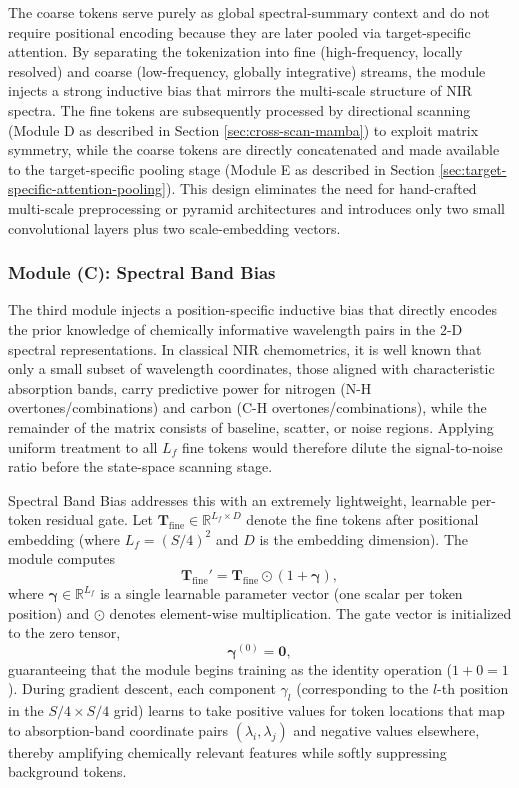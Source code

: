 \documentclass[pdflatex,sn-mathphys-num]{sn-jnl}%
\begin{document}
The coarse tokens serve purely as global spectral-summary context and do not require positional encoding because they are later pooled via target-specific attention.
By separating the tokenization into fine (high-frequency, locally resolved) and coarse (low-frequency, globally integrative) streams, the module injects a strong inductive bias that mirrors the multi-scale structure of NIR spectra. The fine tokens are subsequently processed by directional scanning (Module D as described in Section \ref{sec:cross-scan-mamba}) to exploit matrix symmetry, while the coarse tokens are directly concatenated and made available to the target-specific pooling stage (Module E as described in Section \ref{sec:target-specific-attention-pooling}). This design eliminates the need for hand-crafted multi-scale preprocessing or pyramid architectures and introduces only two small convolutional layers plus two scale-embedding vectors.

\subsubsection{Module (C): Spectral Band Bias}
The third module injects a position-specific inductive bias that directly encodes the prior knowledge of chemically informative wavelength pairs in the $2$-D spectral representations. In classical NIR chemometrics, it is well known that only a small subset of wavelength coordinates, those aligned with characteristic absorption bands, carry predictive power for nitrogen (N-H overtones/combinations) and carbon (C-H overtones/combinations), while the remainder of the matrix consists of baseline, scatter, or noise regions. Applying uniform treatment to all $L_f$ fine tokens would therefore dilute the signal-to-noise ratio before the state-space scanning stage.

Spectral Band Bias addresses this with an extremely lightweight, learnable per-token residual gate. Let $\mathbf{T}_\text{fine} \in \mathbb{R}^{L_f \times D}$ denote the fine tokens after positional embedding (where $L_f = (S/4)^2$ and $D$ is the embedding dimension). The module computes
\begin{equation}
    \mathbf{T}_\text{fine}' = \mathbf{T}_\text{fine} \odot (1 + \boldsymbol{\gamma}),
\end{equation}
where $\boldsymbol{\gamma} \in \mathbb{R}^{L_f}$ is a single learnable parameter vector (one scalar per token position) and $\odot$ denotes element-wise multiplication. The gate vector is initialized to the zero tensor,
\begin{equation}
    \boldsymbol{\gamma}^{(0)} = \mathbf{0},
\end{equation}
guaranteeing that the module begins training as the identity operation ($1 + 0 = 1$). During gradient descent, each component $\gamma_l$ (corresponding to the $l$-th position in the $S/4 \times S/4$ grid) learns to take positive values for token locations that map to absorption-band coordinate pairs $(\lambda_i, \lambda_j)$ and negative values elsewhere, thereby amplifying chemically relevant features while softly suppressing background tokens.
\end{document}
